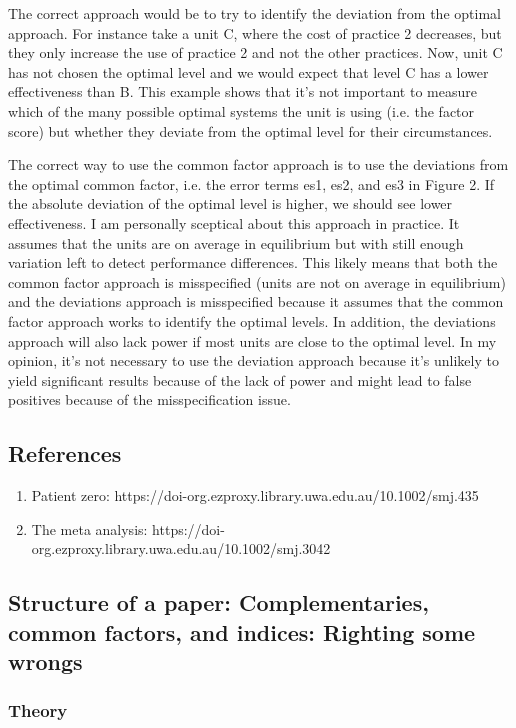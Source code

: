 \documentclass[]{article} %
\begin{document}
The correct approach would be to try to identify the deviation from
the optimal approach. For instance take a unit C, where the cost of
practice 2 decreases, but they only increase the use of practice 2 and
not the other practices.  Now, unit C has not chosen the optimal
level and we would expect that level C has a lower effectiveness than
B. This example shows that it's not important to measure which of the
many possible optimal systems the unit is using (i.e. the factor
score) but whether they deviate from the optimal level for their
circumstances. 
 
The correct way to use the common factor approach is to use the
deviations from the optimal common factor, i.e. the error terms es1,
es2, and es3 in Figure 2. If the absolute deviation of the optimal
level is higher, we should see lower effectiveness. I am personally
sceptical about this approach in practice. It assumes that the units
are on average in equilibrium but with still enough variation left to
detect performance differences. This likely means that both the common
factor approach is misspecified (units are not on average in
equilibrium) and the deviations approach is misspecified because it
assumes that the common factor approach works to identify the optimal
levels. In addition, the deviations approach will also lack power if
most units are close to the optimal level. In my opinion, it's not
necessary to use the deviation approach because it's unlikely to yield
significant results because of the lack of power and might lead to
false positives because of the misspecification issue. 

\subsection{References}

\begin{enumerate}
    \item Patient zero: https://doi-org.ezproxy.library.uwa.edu.au/10.1002/smj.435
    \item The meta analysis: https://doi-org.ezproxy.library.uwa.edu.au/10.1002/smj.3042
\end{enumerate}

\subsection{Structure of a paper: Complementaries, common factors, and indices: Righting some wrongs}

\subsubsection{Theory}
\end{document}
